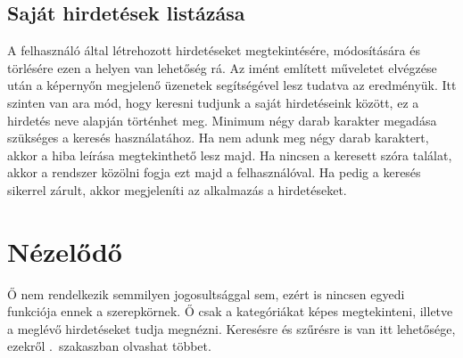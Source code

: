 \documentclass[]{thesis-ekf}
\theoremstyle{definition}
\theoremstyle{remark}
\begin{document}
		\subsection{Saját hirdetések listázása}
			A felhasználó által létrehozott hirdetéseket megtekintésére, módosítására és törlésére ezen a helyen van lehetőség rá. Az imént említett műveletet elvégzése után a képernyőn megjelenő üzenetek segítségével lesz tudatva az eredményük. Itt szinten van ara mód, hogy keresni tudjunk a saját hirdetéseink között, ez a hirdetés neve alapján történhet meg. Minimum négy darab karakter megadása szükséges a keresés használatához. Ha nem adunk meg négy darab karaktert, akkor a hiba leírása megtekinthető lesz majd. Ha nincsen a keresett szóra találat, akkor a rendszer közölni fogja ezt majd a felhasználóval. Ha pedig a keresés sikerrel zárult, akkor megjeleníti az alkalmazás a hirdetéseket.
	\section{Nézelődő}
		Ő nem rendelkezik semmilyen jogosultsággal sem, ezért is nincsen egyedi funkciója ennek a szerepkörnek. Ő csak a kategóriákat képes megtekinteni, illetve a meglévő hirdetéseket tudja megnézni. Keresésre és szűrésre is van itt lehetősége, ezekről .~szakaszban olvashat többet.
		
\end{document}
